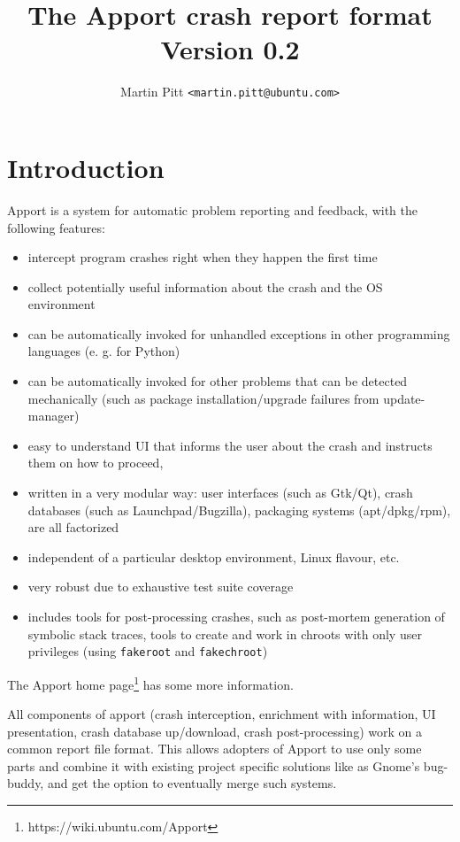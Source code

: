 \documentclass[DIV12,halfparskip]{scrartcl}
\title{The Apport crash report format\\
  \vspace{1ex}\large Version 0.2}
\author{Martin Pitt \texttt{<martin.pitt@ubuntu.com>}}
\begin{document}
\maketitle

\tableofcontents

\newpage
\section{Introduction}

Apport is a system for automatic problem reporting and feedback, with the
following features:

\begin{itemize}
    \item intercept program crashes right when they happen the first time
    \item collect potentially useful information about the crash and the OS environment
    \item can be automatically invoked for unhandled exceptions in other programming languages (e. g. for Python)
    \item can be automatically invoked for other problems that can be
        detected mechanically (such as package installation/upgrade failures from update-manager)
    \item easy to understand UI that informs the user about the crash and instructs them on how to proceed,
    \item written in a very modular way: user interfaces (such as Gtk/Qt),
    crash databases (such as Launchpad/Bugzilla), packaging systems
    (apt/dpkg/rpm), are all factorized
    \item independent of a particular desktop environment, Linux flavour, etc.
    \item very robust due to exhaustive test suite coverage
    \item includes tools for post-processing crashes, such as post-mortem
    generation of symbolic stack traces, tools to create and work in chroots
    with only user privileges (using \verb!fakeroot! and \verb!fakechroot!)
\end{itemize}

The Apport home page\footnote{https://wiki.ubuntu.com/Apport} has some more
information.

All components of apport (crash interception, enrichment with information, UI
presentation, crash database up/download, crash post-processing) work on a
common report file format. This allows adopters of Apport to use only some
parts and combine it with existing project specific solutions like as Gnome's
bug-buddy, and get the option to eventually merge such systems.
\end{document}

